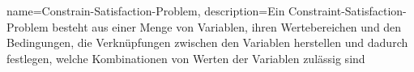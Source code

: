 
{
  name=Constrain-Satisfaction-Problem,
  description={Ein Constraint-Satisfaction-Problem besteht aus einer Menge von Variablen, ihren Wertebereichen und den Bedingungen, die Verknüpfungen zwischen den Variablen herstellen und dadurch festlegen, welche Kombinationen von Werten der Variablen zulässig sind}
}

